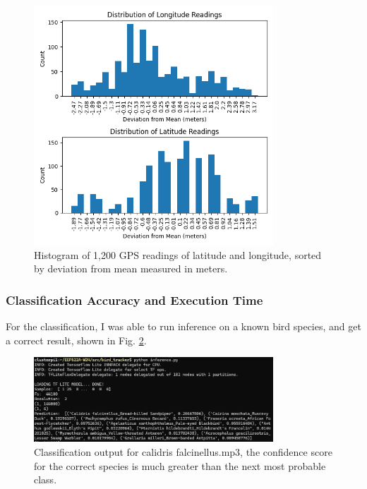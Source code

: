 \documentclass[12pt]{article}
\begin{document}
\begin{figure}[h]
\centering
\includegraphics[width=0.8\textwidth]{GPS_distribution.png} %
\caption{Histogram of 1,200 GPS readings of latitude and longitude, sorted by deviation from mean measured in meters.}
\label{fig:gps_distribution}
\end{figure}

\subsubsection{Classification Accuracy and Execution Time}

For the classification, I was able to run inference on a known bird species, and get a correct result, shown in Fig. \ref{fig:classification_result}.

\begin{figure}[h]
\centering
\includegraphics[width=0.8\textwidth]{classification_result.png} %
\caption{Classification output for calidris falcinellus.mp3, the confidence score for the correct species is much greater than the next most probable class.}
\label{fig:classification_result}
\end{figure}
\end{document}
